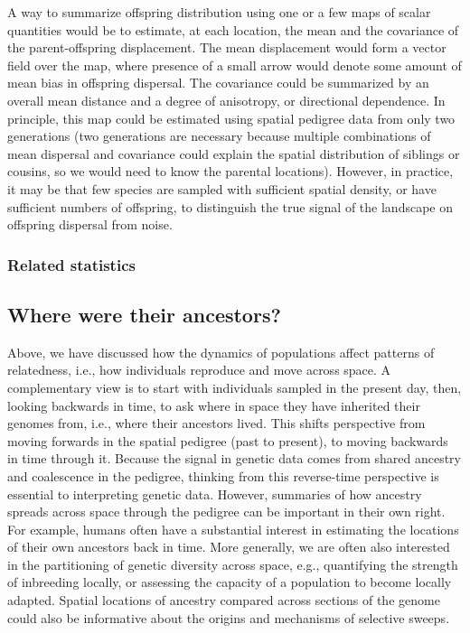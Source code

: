\documentclass{ar-1col}
\newcommand{\todo}[1]{{\textbf{\color{red}{#1}}}}
\begin{document}
A way to summarize offspring distribution 
using one or a few maps of scalar quantities would be to estimate, 
at each location, the mean and the covariance of the parent-offspring displacement.
The mean displacement would form a vector field over the map,
where presence of a small arrow would denote some amount of mean bias in offspring dispersal.
The covariance could be summarized by an overall mean distance and a degree of anisotropy, 
or directional dependence.
In principle, this map could be estimated using 
spatial pedigree data from only two generations 
(two generations are necessary because 
multiple combinations of mean dispersal and covariance 
could explain the spatial distribution of siblings or cousins, 
so we would need to know the parental locations).
However, in practice, it may be that 
few species are sampled with sufficient spatial density, 
or have sufficient numbers of offspring, 
to distinguish the true signal of the landscape on offspring dispersal from noise.

\subsubsection{Related statistics}

\todo{$m$ between "discrete pops", resistance distance.
methods: scat, ringbauer2018, ralphcoop, cayuela refs, cockerhaweir1993, eems, newEems, bedassle, duforet-frebourg and blum}

\subsection{Where were their ancestors?}

Above, we have discussed how the dynamics of populations affect
patterns of relatedness,
i.e., how individuals reproduce and move across space.
A complementary view is to
start with individuals sampled in the present day,
then, looking backwards in time,
to ask where in space they have inherited their genomes from, 
i.e., where their ancestors lived.
This shifts perspective from moving forwards in the spatial pedigree
(past to present),
to moving backwards in time through it.
Because the signal in genetic data comes from 
shared ancestry and coalescence in the pedigree,
thinking from this reverse-time perspective 
is essential to interpreting genetic data.
However, summaries of how ancestry spreads across space 
through the pedigree can be important in their own right.
For example, humans often have a substantial interest 
in estimating the locations of their own ancestors back in time.
More generally,
we are often also interested in the partitioning of genetic diversity across space,
e.g.,
quantifying the strength of inbreeding locally,
or assessing the capacity of a population to become locally adapted.
Spatial locations of ancestry compared across sections of the genome
could also be informative about the origins and mechanisms of selective sweeps.
\end{document}
